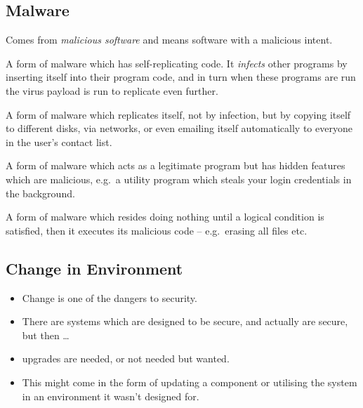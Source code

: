 \documentclass{beamer}
\begin{document}
\subsection{Malware}

\begin{frame}{\insertsubsectionhead}
  \begin{definition}[Malware]
    Comes from \emph{malicious software} and means software with a malicious 
    intent.
  \end{definition}
  \begin{definition}
    A form of malware which has self-replicating code.
    It \emph{infects} other programs by inserting itself into their program 
    code, and in turn when these programs are run the virus payload is run to 
    replicate even further.
  \end{definition}
  \begin{definition}[Worm]
    A form of malware which replicates itself, not by infection, but by copying 
    itself to different disks, via networks, or even emailing itself 
    automatically to everyone in the user's contact list.
  \end{definition}
\end{frame}

\begin{frame}{\insertsubsectionhead}
  \begin{definition}
    A form of malware which acts as a legitimate program but has hidden 
    features which are malicious, e.g.\ a utility program which steals your 
    login credentials in the background.
  \end{definition}
  \begin{definition}
    A form of malware which resides doing nothing until a logical condition is 
    satisfied, then it executes its malicious code -- e.g.\ erasing all files 
    etc.
  \end{definition}
\end{frame}

\subsection{Change in Environment}

\begin{frame}{\insertsubsectionhead}
  \begin{itemize}
    \item Change is one of the dangers to security.

    \item There are systems which are designed to be secure, and actually are 
      secure, but then \dots

    \item upgrades are needed, or not needed but wanted.

    \item This might come in the form of updating a component or utilising the 
      system in an environment it wasn't designed for.

  \end{itemize}
\end{frame}
\end{document}
